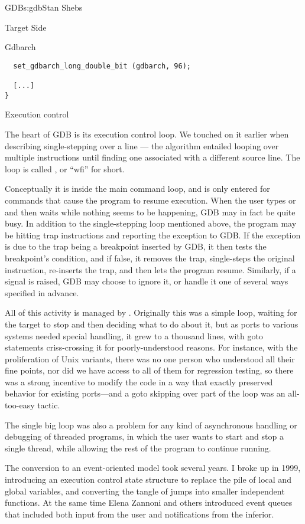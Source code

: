 \begin{aosachapter}{GDB}{s:gdb}{Stan Shebs}
\begin{aosasect1}{Target Side}
\begin{aosasect2}{Gdbarch}
\begin{verbatim}
  set_gdbarch_long_double_bit (gdbarch, 96);

  [...]
}
\end{verbatim}

\end{aosasect2}

\begin{aosasect2}{Execution control}

The heart of GDB is its execution control loop.  We touched on it
earlier when describing single-stepping over a line --- the algorithm
entailed looping over multiple instructions until finding one
associated with a different source line.  The loop is called , or ``wfi'' for short.

Conceptually it is inside the main command loop, and is only entered
for commands that cause the program to resume execution.  When the
user types  or  and then waits while nothing
seems to be happening, GDB may in fact be quite busy.  In addition to
the single-stepping loop mentioned above, the program may be hitting
trap instructions and reporting the exception to GDB.  If the
exception is due to the trap being a breakpoint inserted by GDB, it
then tests the breakpoint's condition, and if false, it removes the
trap, single-steps the original instruction, re-inserts the trap, and
then lets the program resume.  Similarly, if a signal is raised, GDB
may choose to ignore it, or handle it one of several ways specified in
advance.

All of this activity is managed by .
Originally this was a simple loop, waiting for the target to stop and
then deciding what to do about it, but as ports to various systems
needed special handling, it grew to a thousand lines, with goto
statements criss-crossing it for poorly-understood reasons.  For
instance, with the proliferation of Unix variants, there was no one
person who understood all their fine points, nor did we have access to
all of them for regression testing, so there was a strong incentive to
modify the code in a way that exactly preserved behavior for existing
ports---and a goto skipping over part of the loop was an all-too-easy
tactic.

The single big loop was also a problem for any kind of asynchronous
handling or debugging of threaded programs, in which the user wants to
start and stop a single thread, while allowing the rest of the program
to continue running.

The conversion to an event-oriented model took several years.  I broke
up  in 1999, introducing an execution
control state structure to replace the pile of local and global
variables, and converting the tangle of jumps into smaller independent
functions.  At the same time Elena Zannoni and others introduced event
queues that included both input from the user and notifications from
the inferior.


\end{aosasect2}
\end{aosasect1}
\end{aosachapter}
